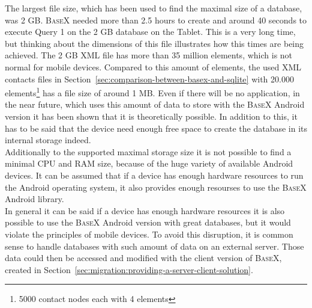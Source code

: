 The largest file size, which has been used to find the maximal size of a database, was 2 GB.
\textsc{BaseX} needed more than 2.5 hours to create and around 40 seconds to execute Query 1 on the 2 GB database on the Tablet.
This is a very long time, but thinking about the dimensions of this file illustrates how this times are being achieved.
The 2 GB XML file has more than 35 million elements, which is not normal for mobile devices.
Compared to this amount of elements, the used XML contacts files in Section~\ref{sec:comparison-between-basex-and-sqlite} with 20.000 elements\footnote{5000 contact nodes each with 4 elements} has a file size of around 1 MB.
Even if there will be no application, in the near future, which uses this amount of data to store with the \textsc{BaseX} Android version it has been shown that it is theoretically possible.
In addition to this, it has to be said that the device need enough free space to create the database in its internal storage indeed.\\
Additionally to the supported maximal storage size it is not possible to find a minimal CPU and RAM size, because of the huge variety of available Android devices.
It can be assumed that if a device has enough hardware resources to run the Android operating system, it also provides enough resourses to use the \textsc{BaseX} Android library.\\
In general it can be said if a device has enough hardware resources it is also possible to use the \textsc{BaseX} Android version with great databases, but it would violate the principles of mobile devices.
To avoid this disruption, it is common sense to handle databases with such amount of data on an external server.
Those data could then be accessed and modified with the client version of \textsc{BaseX}, created in Section~\ref{sec:migration:providing-a-server-client-solution}.




